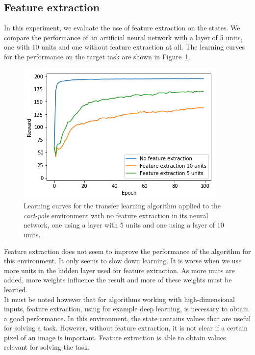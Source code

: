 \subsection{Feature extraction} %
\label{sub:feature_extraction}
In this experiment, we evaluate the use of feature extraction on the states. We compare the performance of an artificial neural network with a layer of 5 units, one with 10 units and one without feature extraction at all. The learning curves for the performance on the target task are shown in Figure~\ref{fig:CartPole:feature_extraction}.
\begin{figure}[htb]
    \centering
    \includegraphics[width=.8\linewidth]{images/results/CartPole/feature_extraction.png}
    \caption{Learning curves for the transfer learning algorithm applied to the \textit{cart-pole} environment with no feature extraction in its neural network, one using a layer with 5 units and one using a layer of 10 units.}
    \label{fig:CartPole:feature_extraction}
\end{figure}
Feature extraction does not seem to improve the performance of the algorithm for this environment. It only seems to slow down learning. It is worse when we use more units in the hidden layer used for feature extraction. As more units are added, more weights influence the result and more of these weights must be learned.\\
It must be noted however that for algorithms working with high-dimensional inputs, feature extraction, using for example deep learning, is necessary to obtain a good performance. In this environment, the state contains values that are useful for solving a task. However, without feature extraction, it is not clear if a certain pixel of an image is important. Feature extraction is able to obtain values relevant for solving the task.\\

